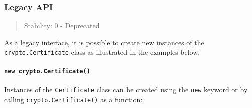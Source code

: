 \begin{Shaded}
\begin{Highlighting}[]
\NormalTok{ \{ }\NormalTok{ \} }\OperatorTok{=} \NormalTok{(}\NormalTok{)}\OperatorTok{;}
\OperatorTok{=} \NormalTok{(}\NormalTok{)}\OperatorTok{;}

\OperatorTok{=} \NormalTok{()}\OperatorTok{;}
\NormalTok{(}\OperatorTok{;}
\end{Highlighting}
\end{Shaded}

\subsubsection{Legacy API}\label{legacy-api}

\begin{quote}
Stability: 0 - Deprecated
\end{quote}

As a legacy interface, it is possible to create new instances of the
\texttt{crypto.Certificate} class as illustrated in the examples below.

\paragraph{\texorpdfstring{\texttt{new\ crypto.Certificate()}}{new crypto.Certificate()}}\label{new-crypto.certificate}

Instances of the \texttt{Certificate} class can be created using the
\texttt{new} keyword or by calling \texttt{crypto.Certificate()} as a
function:

\begin{Shaded}
\begin{Highlighting}[]
\OperatorTok{=}  \NormalTok{(}\NormalTok{)}\OperatorTok{;}

\OperatorTok{=}  \NormalTok{()}\OperatorTok{;}
\OperatorTok{=} \NormalTok{()}\OperatorTok{;}
\end{Highlighting}
\end{Shaded}

